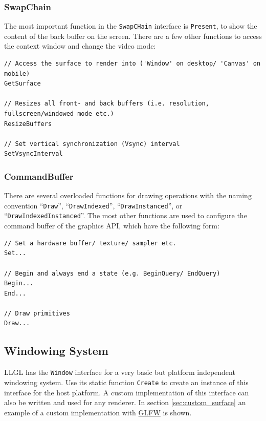 \documentclass{article}
\begin{document}
\subsubsection{SwapChain}

The most important function in the \texttt{SwapCHain} interface is \texttt{Present},
to show the content of the back buffer on the screen.
There are a few other functions to access the context window and change the video mode:
\begin{lstlisting}
// Access the surface to render into ('Window' on desktop/ 'Canvas' on mobile)
GetSurface

// Resizes all front- and back buffers (i.e. resolution, fullscreen/windowed mode etc.)
ResizeBuffers

// Set vertical synchronization (Vsync) interval
SetVsyncInterval
\end{lstlisting}

\subsubsection{CommandBuffer}

There are several overloaded functions for drawing operations with the naming convention
``\texttt{Draw}'', ``\texttt{DrawIndexed}'', ``\texttt{DrawInstanced}'', or ``\texttt{DrawIndexedInstanced}''.
The most other functions are used to configure the command buffer of the graphics API, which have the following form:
\begin{lstlisting}
// Set a hardware buffer/ texture/ sampler etc.
Set...

// Begin and always end a state (e.g. BeginQuery/ EndQuery)
Begin...
End...

// Draw primitives
Draw...
\end{lstlisting}

\subsection{Windowing System}

LLGL has the \texttt{Window} interface for a very basic but platform independent windowing system.
Use its static function \texttt{Create} to create an instance of this interface for the host platform.
A custom implementation of this interface can also be written and used for any renderer.
In section \ref{sec:custom_surface} an example of a custom implementation with \href{http://www.glfw.org/}{GLFW} is shown.


\end{document}
